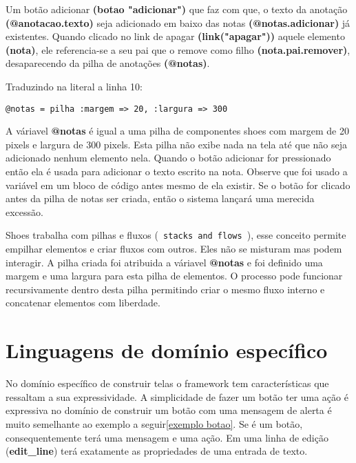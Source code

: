 \documentclass[espaco=simples,appendix=Name]{abnt}
\begin{document}
Um botão adicionar \textbf{(botao "adicionar")} que faz com que, o texto da anotação \textbf{(@anotacao.texto)} seja adicionado em baixo das notas \textbf{(@notas.adicionar)} já existentes. Quando clicado no link de apagar \textbf{(link("apagar"))} aquele elemento \textbf{(nota)}, ele referencia-se a seu pai que o remove como filho \textbf{(nota.pai.remover)}, desaparecendo da pilha de anotações \textbf{(@notas)}.


 

Traduzindo na literal a linha 10:

\begin{lstlisting}[caption=Entendendo a pilha de componentes]
  @notas = pilha :margem => 20, :largura => 300
\end{lstlisting}

A váriavel \textbf{@notas} é igual a uma pilha de componentes shoes com margem de 20 pixels e largura de 300 pixels. Esta pilha não exibe nada na tela até que não seja adicionado nenhum elemento nela. Quando o botão adicionar for pressionado então ela é usada para adicionar o texto escrito na nota. Observe que foi usado a variável em um bloco de código antes mesmo de ela existir. Se o botão for clicado antes da pilha de notas ser criada, então o sistema lançará uma merecida excessão. 

Shoes trabalha com pilhas e fluxos (\texttt{ stacks and flows }), esse conceito permite empilhar elementos e criar fluxos com outros. Eles não se misturam mas podem interagir. A pilha criada foi atribuida a váriavel \textbf{ @notas } e foi definido uma margem e uma largura para esta pilha de elementos. O processo pode funcionar recursivamente dentro desta pilha permitindo criar o mesmo fluxo interno e concatenar elementos com liberdade.

\chapter { Linguagens de domínio específico }

No domínio específico de construir telas o framework tem características que ressaltam a sua expressividade. A simplicidade de fazer um botão ter uma ação é expressiva no domínio de construir um botão com uma mensagem de alerta é muito semelhante ao exemplo a seguir\ref{exemplo botao}. Se é um botão, consequentemente terá uma mensagem e uma ação.  Em uma linha de edição (\textbf{edit\_line}) terá exatamente as propriedades de uma entrada de texto. 
\end{document}
